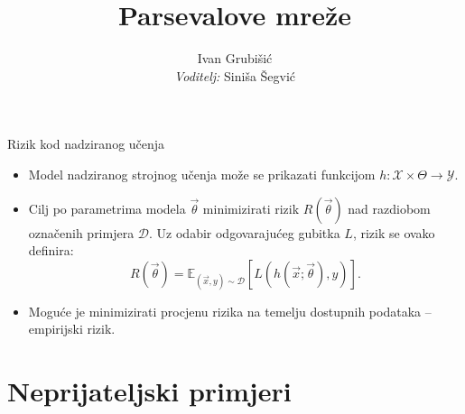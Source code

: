 \documentclass{beamer}
\title{Parsevalove mreže}
\author{Ivan Grubišić \\ \emph{Voditelj:} Siniša Šegvić}
\institute{Fakultet elektrotehnike i računarstva}
\date{}
\begin{document}
	
\begin{frame}
	\titlepage
\end{frame}

\note[itemize]{}

\begin{frame}{Rizik kod nadziranog učenja}	
	\begin{itemize}
		\item Model nadziranog strojnog učenja može se prikazati funkcijom $h:\mathcal{X}\times\Theta\to\mathcal{Y}$.
		\item Cilj po parametrima modela $\vec\theta$ minimizirati rizik $R(\vec\theta)$ nad razdiobom označenih primjera $\mathcal{D}$. Uz odabir odgovarajućeg gubitka $L$, rizik se ovako definira:
		\begin{equation}
		R(\vec\theta) = \mathbb{E}_{(\vec x,y)\sim\mathcal{D}}\left[L(h(\vec x;\vec\theta), y)\right].
		\end{equation}
		\item Moguće je minimizirati procjenu rizika na temelju dostupnih podataka -- empirijski rizik.
	\end{itemize}
\end{frame}
\note[itemize]{}

\section{Neprijateljski primjeri}
\end{document}
